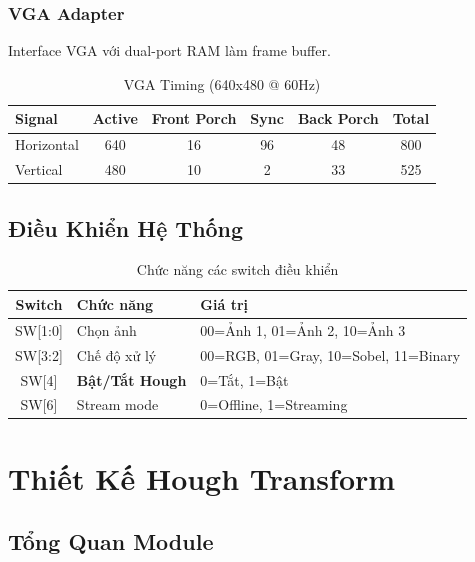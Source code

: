 \documentclass[12pt,a4paper]{report}
\begin{document}
\subsection{VGA Adapter}
Interface VGA với dual-port RAM làm frame buffer.

\begin{table}[H]
\centering
\caption{VGA Timing (640x480 @ 60Hz)}
\begin{tabular}{|l|c|c|c|c|c|}
\hline
\textbf{Signal} & \textbf{Active} & \textbf{Front Porch} & \textbf{Sync} & \textbf{Back Porch} & \textbf{Total} \\
\hline
Horizontal & 640 & 16 & 96 & 48 & 800 \\
Vertical & 480 & 10 & 2 & 33 & 525 \\
\hline
\end{tabular}
\end{table}

\section{Điều Khiển Hệ Thống}

\begin{table}[H]
\centering
\caption{Chức năng các switch điều khiển}
\label{tab:sw_control}
\begin{tabular}{|c|l|l|}
\hline
\textbf{Switch} & \textbf{Chức năng} & \textbf{Giá trị} \\
\hline
SW[1:0] & Chọn ảnh & 00=Ảnh 1, 01=Ảnh 2, 10=Ảnh 3 \\
SW[3:2] & Chế độ xử lý & 00=RGB, 01=Gray, 10=Sobel, 11=Binary \\
\rowcolor{purple!20}
SW[4] & \textbf{Bật/Tắt Hough} & 0=Tắt, 1=Bật \\
SW[6] & Stream mode & 0=Offline, 1=Streaming \\
\hline
\end{tabular}
\end{table}

\chapter{Thiết Kế Hough Transform}

\section{Tổng Quan Module}
\end{document}
